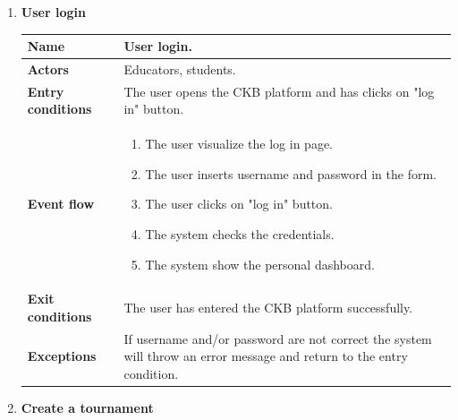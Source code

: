 \begin{enumerate}[label=\textbf{UC.\arabic*}]
\begin{table}[H]
\begin{tabular}{|m{3.2cm}|m{9.8cm}|}
                    \hline 
                \end{tabular}
        \end{table}
        \item {} \textbf{User login}
        \begin{table}[H]
    	    \centering
                \renewcommand{\arraystretch}{1.5}
                \begin{tabular}{|m{3.2cm}|m{9.8cm}|}
                    \hline
                    \textbf{Name} & User login.\\
                    \hline
                    \textbf{Actors} &  Educators, students. \\
                    \hline
                    \textbf{Entry conditions}  & The user opens the CKB platform and has clicks on "log in" button. \\
                    \hline
                    \textbf{Event flow}  & 
                    \begin{enumerate}[label=\arabic*.]
                        \item The user visualize the log in page.
                        \item The user inserts username and password in the form.
                        \item The user clicks on "log in" button.
                        \item The system checks the credentials.
                        \item The system show the personal dashboard.
                    \end{enumerate}\\
                    \hline
                    \textbf{Exit conditions}  & The user has entered the CKB platform successfully. \\
                    \hline
                    \textbf{Exceptions}  & If username and/or password are not correct the system will throw an error message and return to the entry condition. \\
                    \hline 
                \end{tabular}
        \end{table}
        \item {} \textbf{Create a tournament}
        \begin{table}[H]
    	    \centering
                \renewcommand{\arraystretch}{1.5}
                \begin{tabular}{|m{3.2cm}|m{9.8cm}|}

\end{tabular}
\end{table}
\end{enumerate}
